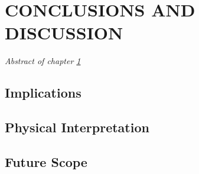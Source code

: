 \def\baselinestretch{1}
\chapter{CONCLUSIONS AND DISCUSSION} \label{chap:conclusion}
    \minitoc
    \begin{center}
    	\emph{Abstract of chapter \ref{chap:conclusion}}
    \end{center}
    
    \section{Implications}
    
    \section{Physical Interpretation}
    
    \section{Future Scope}